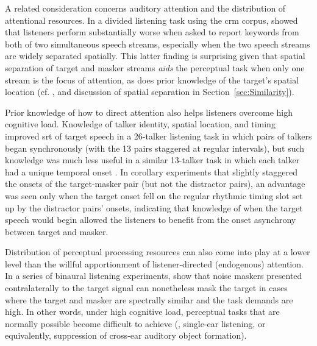 A related consideration concerns auditory attention and the distribution of attentional resources.  In a divided listening task using the \ac{crm} corpus, \citet{BestEtAl2006} showed that listeners perform substantially worse when asked to report keywords from both of two simultaneous speech streams, especially when the two speech streams are widely separated spatially.  This latter finding is surprising given that spatial separation of target and masker streams {\em aids} the perceptual task when only one stream is the focus of attention, as does prior knowledge of the target’s spatial location (cf. \citealt{KiddEtAl2005a}, and discussion of spatial separation in Section~\ref{sec:Similarity}).  

Prior knowledge of how to direct attention also helps listeners overcome high cognitive load.  Knowledge of talker identity, spatial location, and timing improved \ac{srt} of target speech in a 26-talker listening task in which pairs of talkers began synchronously (with the 13 pairs staggered at regular intervals), but such knowledge was much less useful in a similar 13-talker task in which each talker had a unique temporal onset \citep{KitterickEtAl2010}.  In corollary experiments that slightly staggered the onsets of the target-masker pair (but not the distractor pairs), an advantage was seen only when the target onset fell on the regular rhythmic timing slot set up by the distractor pairs’ onsets, indicating that knowledge of when the target speech would begin allowed the listeners to benefit from the onset asynchrony between target and masker.

Distribution of perceptual processing resources can also come into play at a lower level than the willful apportionment of listener-directed (endogenous) attention.  In a series of binaural listening experiments, \citet{GallunEtAl2007} show that noise maskers presented contralaterally to the target signal can nonetheless mask the target in cases where the target and masker are spectrally similar and the task demands are high.  In other words, under high cognitive load, perceptual tasks that are normally possible become difficult to achieve (\eg, single-ear listening, or equivalently, suppression of cross-ear auditory object formation).  %


